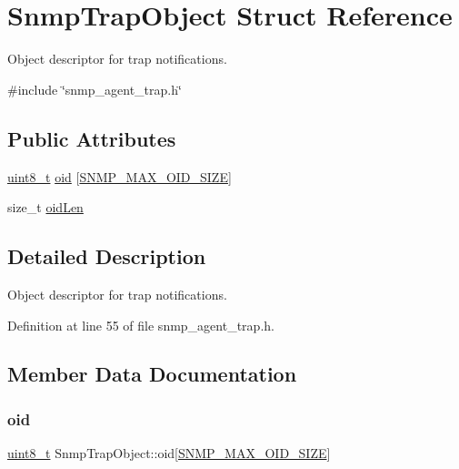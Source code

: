 \hypertarget{structSnmpTrapObject}{}\section{Snmp\+Trap\+Object Struct Reference}
\label{structSnmpTrapObject}


Object descriptor for trap notifications.  




{\ttfamily \#include \char`\"{}snmp\+\_\+agent\+\_\+trap.\+h\char`\"{}}

\subsection*{Public Attributes}
\begin{DoxyCompactItemize}
\item 
\hyperlink{stdint_8h_aba7bc1797add20fe3efdf37ced1182c5}{uint8\+\_\+t} \hyperlink{structSnmpTrapObject_a1b543e9b2f5f89c9f81cd1308919bad2}{oid} \mbox{[}\hyperlink{snmp__common_8h_a7eee56441ee1b961702e8b4cbe9586a7}{S\+N\+M\+P\+\_\+\+M\+A\+X\+\_\+\+O\+I\+D\+\_\+\+S\+I\+ZE}\mbox{]}
\item 
size\+\_\+t \hyperlink{structSnmpTrapObject_aec6db360dc31d119d36e2aced7580e5f}{oid\+Len}
\end{DoxyCompactItemize}


\subsection{Detailed Description}
Object descriptor for trap notifications. 

Definition at line 55 of file snmp\+\_\+agent\+\_\+trap.\+h.



\subsection{Member Data Documentation}
\mbox{\label{structSnmpTrapObject_a1b543e9b2f5f89c9f81cd1308919bad2}} 
\subsubsection{\texorpdfstring{oid}{oid}}
{\footnotesize\ttfamily \hyperlink{stdint_8h_aba7bc1797add20fe3efdf37ced1182c5}{uint8\+\_\+t} Snmp\+Trap\+Object\+::oid\mbox{[}\hyperlink{snmp__common_8h_a7eee56441ee1b961702e8b4cbe9586a7}{S\+N\+M\+P\+\_\+\+M\+A\+X\+\_\+\+O\+I\+D\+\_\+\+S\+I\+ZE}\mbox{]}}



